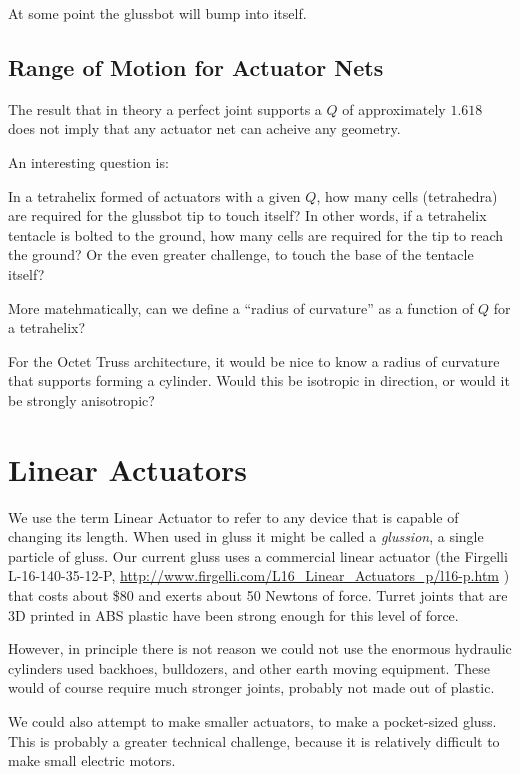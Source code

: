 \documentclass[12pt]{article}
\begin{document}
At some point the glussbot will bump into itself.

\subsection{Range of Motion for Actuator Nets}

The result that in theory a perfect joint supports a $Q$ of approximately $1.618$ does not imply that any actuator net can acheive any
geometry. 

An interesting question is:

In a tetrahelix formed of actuators with a given $Q$, how many cells (tetrahedra) are required for the glussbot tip to touch itself?
In other words, if a tetrahelix tentacle is bolted to the ground, how many cells are required for the tip to reach the ground?
Or the even greater challenge, to touch the base of the tentacle itself?

More matehmatically, can we define a ``radius of curvature'' as a function of $Q$ for a tetrahelix?

For the Octet Truss architecture, it would be nice to know a radius of curvature that supports forming a cylinder. Would this
be isotropic in direction, or would it be strongly anisotropic?  

\section{Linear Actuators}

We use the term Linear Actuator to refer to any device that is capable of changing its length. When
used in gluss it might be called a \emph{glussion}, a single particle of gluss. Our current gluss
uses a commercial linear actuator (the Firgelli L-16-140-35-12-P,
\href{http://www.firgelli.com/L16_Linear_Actuators_p/l16-p.htm}{http://www.firgelli.com/L16\_Linear\_Actuators\_p/l16-p.htm}
)
that costs about \$80 and exerts about 50 Newtons of force.
Turret joints that are 3D printed in ABS plastic have been strong enough for this level of force.

However, in principle there is not reason we could not use the enormous hydraulic cylinders
used backhoes, bulldozers, and other earth moving equipment. These would of course require much
stronger joints, probably not made out of plastic.

We could also attempt to make smaller actuators, to make a pocket-sized gluss. This is probably
a greater technical challenge, because it is relatively difficult to make small electric motors.
\end{document}
